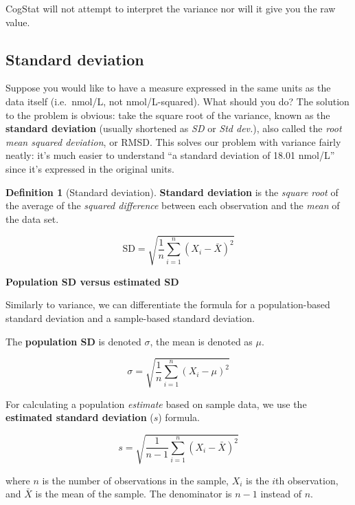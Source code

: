 \documentclass[
]{book}
\newenvironment{callouttitle}{}{}
\theoremstyle{definition}
\newtheorem{definition}{Definition}[chapter]
\theoremstyle{definition}
\theoremstyle{definition}
\theoremstyle{definition}
\theoremstyle{remark}
\begin{document}
CogStat will not attempt to interpret the variance nor will it give you the raw value.

\hypertarget{sd}{%
\subsection{Standard deviation}\label{sd}}

Suppose you would like to have a measure expressed in the same units as the data itself (i.e.~nmol/L, not nmol/L-squared). What should you do? The solution to the problem is obvious: take the square root of the variance, known as the \textbf{standard deviation} (usually shortened as \emph{SD} or \emph{Std dev.}), also called the \emph{root mean squared deviation}, or RMSD. This solves our problem with variance fairly neatly: it's much easier to understand ``a standard deviation of 18.01 nmol/L'' since it's expressed in the original units.

\begin{definition}[Standard deviation]
\protect\hypertarget{def:defSD}{}\label{def:defSD}\textbf{Standard deviation} is the \emph{square root} of the average of the \emph{squared difference} between each observation and the \emph{mean} of the data set.

\[
\mbox{SD} = \sqrt{ \frac{1}{n} \sum_{i=1}^n \left( X_i - \bar{X} \right)^2 }
\]
\end{definition}

\hypertarget{calloutSD}{}
\begin{callout}

\begin{callouttitle}
\textbf{Population SD versus estimated SD}

\end{callouttitle}

\nopagebreak

Similarly to variance, we can differentiate the formula for a population-based standard deviation and a sample-based standard deviation.

The \textbf{population SD} is denoted \(\sigma\), the mean is denoted as \(\mu\).

\[
\sigma = \sqrt{ \frac{1}{n} \sum_{i=1}^n \left( X_i - \mu \right)^2 }
\]

For calculating a population \emph{estimate} based on sample data, we use the \textbf{estimated standard deviation} (\(s\)) formula.

\[
s = \sqrt{ \frac{1}{n-1} \sum_{i=1}^n \left( X_i - \bar{X} \right)^2 }
\]

where \(n\) is the number of observations in the sample, \(X_i\) is the \(i\)th observation, and \(\bar{X}\) is the mean of the sample. The denominator is \(n-1\) instead of \(n\).

\end{callout}
\end{document}
